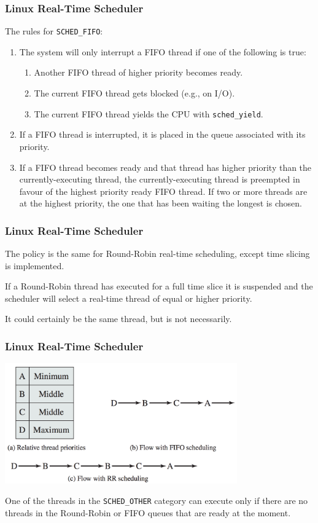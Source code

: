 \begin{frame}
\frametitle{Linux Real-Time Scheduler}

The rules for \texttt{SCHED\_FIFO}:

\begin{enumerate}
	\item The system will only interrupt a FIFO thread if one of the following is true:
	\begin{enumerate}
		\item Another FIFO thread of higher priority becomes ready.
		\item The current FIFO thread gets blocked (e.g., on I/O).
		\item The current FIFO thread yields the CPU with \texttt{sched\_yield}.
	\end{enumerate}
	\item If a FIFO thread is interrupted, it is placed in the queue associated with its priority.
	\item If a FIFO thread becomes ready and that thread has higher priority than the currently-executing thread, the currently-executing thread is preempted in favour of the highest priority ready FIFO thread. If two or more threads are at the highest priority, the one that has been waiting the longest is chosen.
\end{enumerate}


\end{frame}

\begin{frame}
\frametitle{Linux Real-Time Scheduler}

The policy is the same for Round-Robin real-time scheduling, except time slicing is implemented. 

If a Round-Robin thread has executed for a full time slice it is suspended and the scheduler will select a real-time thread of equal or higher priority.

It could certainly be the same thread, but is not necessarily. 

\end{frame}

\begin{frame}
\frametitle{Linux Real-Time Scheduler}

\begin{center}
	\includegraphics[width=0.75\textwidth]{images/linux-rts.png}
\end{center}

One of the threads in the \texttt{SCHED\_OTHER} category can execute only if there are no threads in the Round-Robin or FIFO queues that are ready at the moment.


\end{frame}

